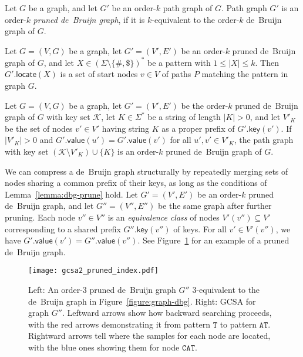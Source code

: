 \documentclass[a4paper,UKenglish]{lipics-v2016}
\newcommand{\set}[1]{\ensuremath{\{ #1 \}}}
\newcommand{\abs}[1]{\ensuremath{\lvert #1 \rvert}}
\newcommand{\dnaseq}[1]{\ensuremath{\mathtt{#1}}}
\newcommand{\locate}{\ensuremath{\mathsf{locate}}}
\newcommand{\gkey}{\ensuremath{\mathsf{key}}}
\newcommand{\gvalue}{\ensuremath{\mathsf{value}}}
\newcommand{\kequivalent}[1]{$#1$\nobreakdash-equivalent}
\newcommand{\orderk}[1]{order\nobreakdash-$#1$}
\newcommand{\patternset}{\ensuremath{(\Sigma \setminus \set{\#, \$})^{\ast}}}
\begin{document}
\begin{definition}
Let $G$ be a graph, and let $G'$ be an \orderk{k} path graph of $G$. Path graph $G'$ is an \orderk{k} \emph{pruned de~Bruijn graph}, if it is \kequivalent{k} to the \orderk{k} de~Bruijn graph of $G$.
\end{definition}

\begin{lemma}\label{lemma:dbg-fp}
Let $G = (V, G)$ be a graph, let $G' = (V', E')$ be an \orderk{k} pruned de~Bruijn graph of $G$, and let $X \in \patternset$ be a pattern with $1 \le \abs{X} \le k$. Then $G'.\locate(X)$ is a set of start nodes $v\in V$ of paths $P$ matching the pattern in graph $G$.
\end{lemma}

\begin{lemma}[Pruning]\label{lemma:dbg-prune}
Let $G = (V, G)$ be a graph, let $G' = (V', E')$ be the \orderk{k} pruned de~Bruijn graph of $G$ with key set $\mathcal{K}$, let $K \in \Sigma^{\ast}$ be a string of length $\abs{K} > 0$, and let $V'_{K}$ be the set of nodes $v' \in V'$ having string $K$ as a proper prefix of $G'.\gkey(v')$.
If $\abs{V'_{K}} > 0$ and $G'.\gvalue(u') = G'.\gvalue(v')$ for all $u', v' \in V'_{K}$, the path graph with key set $(\mathcal{K} \setminus V'_{K}) \cup \set{K}$ is an \orderk{k} pruned de~Bruijn graph of $G$.
\end{lemma}

We can compress a de~Bruijn graph structurally by repeatedly merging sets of nodes sharing a common prefix of their keys, as long as the conditions of Lemma~\ref{lemma:dbg-prune} hold. Let $G' = (V', E')$ be an \orderk{k} pruned de~Bruijn graph, and let $G'' = (V'', E'')$ be the same graph after further pruning. Each node $v'' \in V''$ is an \emph{equivalence class} of nodes $V'(v'') \subseteq V'$ corresponding to a shared prefix $G''.\gkey(v'')$ of keys. For all $v' \in V'(v'')$, we have $G'.\gvalue(v') = G''.\gvalue(v'')$. See Figure~\ref{figure:pruned-index} for an example of a pruned de~Bruijn graph.

\begin{figure}[t!]
\texttt{[image: gcsa2\_pruned\_index.pdf]}
\caption{Left: An \orderk{3} pruned de~Bruijn graph $G''$ \kequivalent{3} to the de~Bruijn graph in Figure~\ref{figure:graph-dbg}. Right: GCSA for graph $G''$. Leftward arrows show how backward searching proceeds, with the red arrows demonstrating it from pattern $\dnaseq{T}$ to pattern $\dnaseq{AT}$. Rightward arrows tell where the samples for each node are located, with the blue ones showing them for node $\dnaseq{CAT}$.}\label{figure:pruned-index}
\end{figure}
\end{document}
